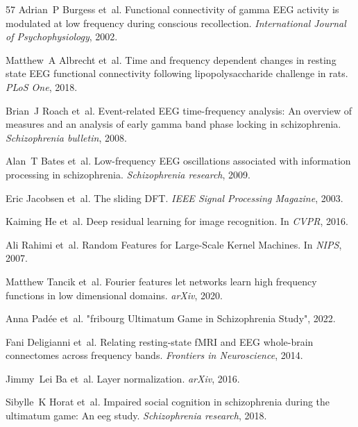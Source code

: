 \documentclass{article}
\begin{document}
\begin{thebibliography}{57}
Adrian~P Burgess et~al.
\newblock Functional connectivity of gamma {EEG} activity is modulated at low frequency during conscious recollection.
\newblock \emph{International {J}ournal of {{P}}sychophysiology}, 2002.

Matthew~A Albrecht et~al.
\newblock Time and frequency dependent changes in resting state {EEG} functional connectivity following lipopolysaccharide challenge in rats.
\newblock \emph{PLoS One}, 2018.

Brian~J Roach et~al.
\newblock Event-related {EEG} time-frequency analysis: {A}n overview of measures and an analysis of early gamma band phase locking in schizophrenia.
\newblock \emph{Schizophrenia bulletin}, 2008.

Alan~T Bates et~al.
\newblock Low-frequency {EEG} oscillations associated with information processing in schizophrenia.
\newblock \emph{Schizophrenia research}, 2009.

Eric Jacobsen et~al.
\newblock The sliding {DFT}.
\newblock \emph{{IEEE} Signal Processing Magazine}, 2003.

Kaiming He et~al.
\newblock Deep residual learning for image recognition.
\newblock In \emph{CVPR}, 2016.

Ali Rahimi et~al.
\newblock Random {F}eatures for {L}arge-{S}cale {K}ernel {M}achines.
\newblock In \emph{NIPS}, 2007.

Matthew Tancik et~al.
\newblock Fourier features let networks learn high frequency functions in low dimensional domains.
\newblock \emph{arXiv}, 2020.

Anna Padée et~al.
\newblock "fribourg {U}ltimatum {G}ame in {S}chizophrenia {S}tudy", 2022.

Fani Deligianni et~al.
\newblock Relating resting-state f{MRI} and {EEG} whole-brain connectomes across frequency bands.
\newblock \emph{Frontiers in Neuroscience}, 2014.

Jimmy~Lei Ba et~al.
\newblock Layer normalization.
\newblock \emph{ar{X}iv}, 2016.

Sibylle~K Horat et~al.
\newblock Impaired social cognition in schizophrenia during the ultimatum game: An eeg study.
\newblock \emph{Schizophrenia research}, 2018.


\end{thebibliography}
\end{document}
